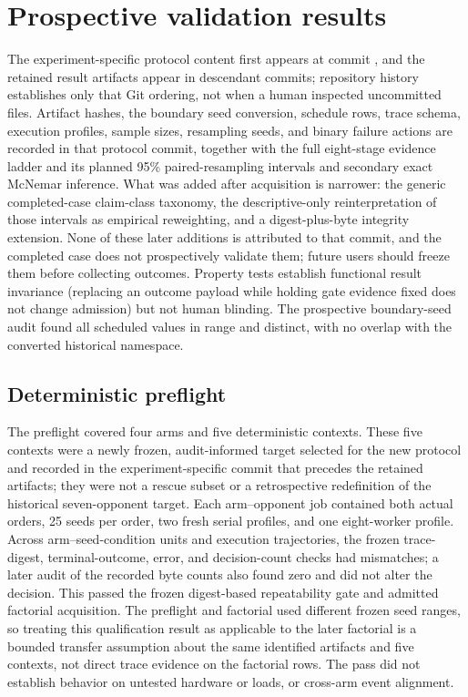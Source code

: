\documentclass[aps,reprint,superscriptaddress,longbibliography,floatfix]{revtex4-2}
\begin{document}
\section{Prospective validation results}

The experiment-specific protocol content first appears at commit
\ProtocolCommitShort, and the retained result artifacts appear in descendant
commits; repository history establishes only that Git ordering, not when a
human inspected uncommitted files.  Artifact hashes, the boundary seed
conversion, schedule rows, trace schema, execution profiles, sample sizes,
resampling seeds, and binary failure actions are recorded in that protocol
commit, together with the full eight-stage evidence ladder and its planned 95\%
paired-resampling intervals and secondary exact McNemar inference.  What was
added after acquisition is narrower: the generic completed-case claim-class
taxonomy, the descriptive-only reinterpretation of those intervals as
empirical reweighting, and a digest-plus-byte integrity extension.  None of
these later additions is attributed to that commit, and the completed case
does not prospectively validate them; future users should freeze them before
collecting outcomes.  Property tests establish functional result invariance
(replacing an outcome payload while holding gate evidence fixed does not
change admission) but not human blinding.  The prospective boundary-seed
audit found all scheduled values in range and distinct, with no overlap with
the converted historical namespace.



\subsection{Deterministic preflight}

The preflight covered four arms and five deterministic contexts.  These five
contexts were a newly frozen, audit-informed target selected for the new
protocol and recorded in the experiment-specific commit that precedes the
retained artifacts; they were not a rescue subset or a retrospective
redefinition of the historical seven-opponent target.  Each arm--opponent job
contained both actual orders, 25 seeds per order, two fresh serial profiles,
and one eight-worker profile.  Across \PreflightUnits{} arm--seed-condition
units and \PreflightExecutions{} execution trajectories, the frozen
trace-digest, terminal-outcome, error, and decision-count checks had
\PreflightMismatches{} mismatches; a later audit of the recorded byte counts
also found zero and did not alter the decision.  This passed the frozen
digest-based repeatability gate and admitted factorial acquisition.  The
preflight and factorial used different frozen seed ranges, so treating this
qualification result as applicable to the later factorial is a bounded
transfer assumption about the same identified artifacts and five contexts,
not direct trace evidence on the factorial rows.  The pass did not establish
behavior on untested hardware or loads, or cross-arm event alignment.
\end{document}
